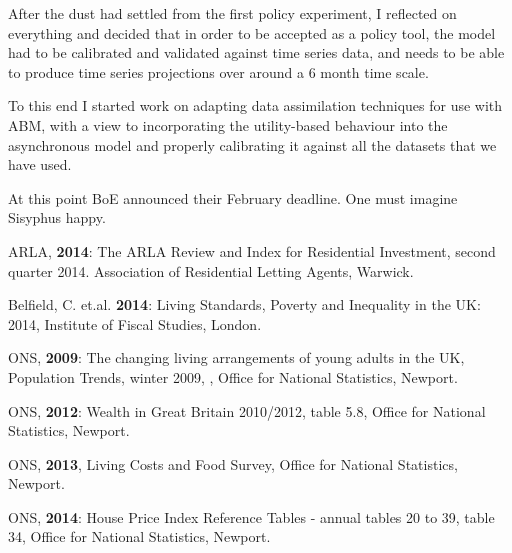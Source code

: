 \documentclass{report}
\begin{document}
After the dust had settled from the first policy experiment, I reflected on everything and decided that in order to be accepted as a policy tool, the model had to be calibrated and validated against time series data, and needs to be able to produce time series projections over around a 6 month time scale.

To this end I started work on adapting data assimilation techniques for use with ABM, with a view to incorporating the utility-based behaviour into the asynchronous model and properly calibrating it against all the datasets that we have used.

At this point BoE announced their February deadline. One must imagine Sisyphus happy.

\appendix
\begin{thebibliography}{20}

 ARLA, \textbf{2014}: The ARLA Review and Index for Residential Investment, second quarter 2014. Association of Residential Letting Agents, Warwick.

 Belfield, C. et.al. \textbf{2014}: Living Standards, Poverty and Inequality in the UK: 2014, Institute of Fiscal Studies, London.

 ONS, \textbf{2009}: The changing living arrangements of young adults in the UK, Population Trends, winter 2009, , Office for National Statistics, Newport.

 ONS, \textbf{2012}: Wealth in Great Britain 2010/2012, table 5.8, Office for National Statistics, Newport.

 ONS, \textbf{2013}, Living Costs and Food Survey, Office for National Statistics, Newport.

 ONS, \textbf{2014}: House Price Index Reference Tables - annual tables 20 to 39, table 34, Office for National Statistics, Newport.


\end{thebibliography}
\end{document}
